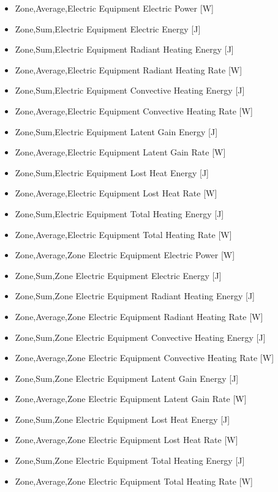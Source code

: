 \begin{itemize}
\item
  Zone,Average,Electric Equipment Electric Power {[}W{]}
\item
  Zone,Sum,Electric Equipment Electric Energy {[}J{]}
\item
  Zone,Sum,Electric Equipment Radiant Heating Energy {[}J{]}
\item
  Zone,Average,Electric Equipment Radiant Heating Rate {[}W{]}
\item
  Zone,Sum,Electric Equipment Convective Heating Energy {[}J{]}
\item
  Zone,Average,Electric Equipment Convective Heating Rate {[}W{]}
\item
  Zone,Sum,Electric Equipment Latent Gain Energy {[}J{]}
\item
  Zone,Average,Electric Equipment Latent Gain Rate {[}W{]}
\item
  Zone,Sum,Electric Equipment Lost Heat Energy {[}J{]}
\item
  Zone,Average,Electric Equipment Lost Heat Rate {[}W{]}
\item
  Zone,Sum,Electric Equipment Total Heating Energy {[}J{]}
\item
  Zone,Average,Electric Equipment Total Heating Rate {[}W{]}
\item
  Zone,Average,Zone Electric Equipment Electric Power {[}W{]}
\item
  Zone,Sum,Zone Electric Equipment Electric Energy {[}J{]}
\item
  Zone,Sum,Zone Electric Equipment Radiant Heating Energy {[}J{]}
\item
  Zone,Average,Zone Electric Equipment Radiant Heating Rate {[}W{]}
\item
  Zone,Sum,Zone Electric Equipment Convective Heating Energy {[}J{]}
\item
  Zone,Average,Zone Electric Equipment Convective Heating Rate {[}W{]}
\item
  Zone,Sum,Zone Electric Equipment Latent Gain Energy {[}J{]}
\item
  Zone,Average,Zone Electric Equipment Latent Gain Rate {[}W{]}
\item
  Zone,Sum,Zone Electric Equipment Lost Heat Energy {[}J{]}
\item
  Zone,Average,Zone Electric Equipment Lost Heat Rate {[}W{]}
\item
  Zone,Sum,Zone Electric Equipment Total Heating Energy {[}J{]}
\item
  Zone,Average,Zone Electric Equipment Total Heating Rate {[}W{]}
\end{itemize}

